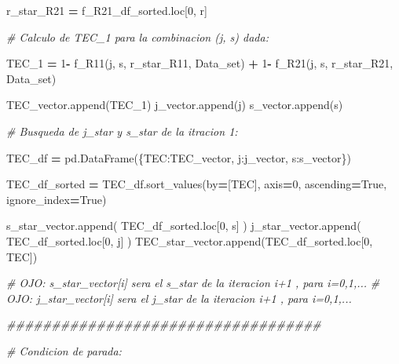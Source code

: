 \documentclass[
  11pt,
  a4paper,
]{article}
\newenvironment{Shaded}{\begin{snugshade}}{\end{snugshade}}
\newcommand{\CommentTok}[1]{\textcolor[rgb]{0.56,0.35,0.01}{\textit{#1}}}
\newcommand{\DecValTok}[1]{\textcolor[rgb]{0.00,0.00,0.81}{#1}}
\newcommand{\NormalTok}[1]{#1}
\newcommand{\OperatorTok}[1]{\textcolor[rgb]{0.81,0.36,0.00}{\textbf{#1}}}
\newcommand{\StringTok}[1]{\textcolor[rgb]{0.31,0.60,0.02}{#1}}
\newcommand{\VariableTok}[1]{\textcolor[rgb]{0.00,0.00,0.00}{#1}}
\begin{document}
\begin{Shaded}
\begin{Highlighting}[]
\NormalTok{                r\_star\_R21 }\OperatorTok{=}\NormalTok{ f\_R21\_df\_sorted.loc[}\DecValTok{0}\NormalTok{, }\StringTok{\textquotesingle{}r\textquotesingle{}}\NormalTok{]}


                \CommentTok{\# Calculo de TEC\_1 para la combinacion (j, s) dada:}

\NormalTok{                TEC\_1 }\OperatorTok{=} \DecValTok{1}\OperatorTok{{-}}\NormalTok{ f\_R11(j, s, r\_star\_R11, Data\_set) }\OperatorTok{+} \DecValTok{1}\OperatorTok{{-}}\NormalTok{ f\_R21(j, s, r\_star\_R21, Data\_set)}

\NormalTok{                TEC\_vector.append(TEC\_1)}
\NormalTok{                j\_vector.append(j)}
\NormalTok{                s\_vector.append(s)}


        \CommentTok{\# Busqueda de j\_star y s\_star de la itracion 1:}

\NormalTok{        TEC\_df }\OperatorTok{=}\NormalTok{ pd.DataFrame(\{}\StringTok{\textquotesingle{}TEC\textquotesingle{}}\NormalTok{:TEC\_vector, }\StringTok{\textquotesingle{}j\textquotesingle{}}\NormalTok{:j\_vector, }\StringTok{\textquotesingle{}s\textquotesingle{}}\NormalTok{:s\_vector\})}

\NormalTok{        TEC\_df\_sorted }\OperatorTok{=}\NormalTok{ TEC\_df.sort\_values(by}\OperatorTok{=}\NormalTok{[}\StringTok{\textquotesingle{}TEC\textquotesingle{}}\NormalTok{], axis}\OperatorTok{=}\DecValTok{0}\NormalTok{, ascending}\OperatorTok{=}\VariableTok{True}\NormalTok{, ignore\_index}\OperatorTok{=}\VariableTok{True}\NormalTok{)}

\NormalTok{        s\_star\_vector.append( TEC\_df\_sorted.loc[}\DecValTok{0}\NormalTok{, }\StringTok{\textquotesingle{}s\textquotesingle{}}\NormalTok{] )}
\NormalTok{        j\_star\_vector.append( TEC\_df\_sorted.loc[}\DecValTok{0}\NormalTok{, }\StringTok{\textquotesingle{}j\textquotesingle{}}\NormalTok{] )}
\NormalTok{        TEC\_star\_vector.append(TEC\_df\_sorted.loc[}\DecValTok{0}\NormalTok{, }\StringTok{\textquotesingle{}TEC\textquotesingle{}}\NormalTok{])}

        \CommentTok{\# OJO: s\_star\_vector[i] sera el s\_star de la iteracion i+1 , para i=0,1,...}
        \CommentTok{\# OJO: j\_star\_vector[i] sera el j\_star de la iteracion i+1 , para i=0,1,...    }
        
      \CommentTok{\#\#\#\#\#\#\#\#\#\#\#\#\#\#\#\#\#\#\#\#\#\#\#\#\#\#\#\#\#\#\#\#\#\#\#}

        \CommentTok{\# Condicion de parada:}


\end{Highlighting}
\end{Shaded}
\end{document}
